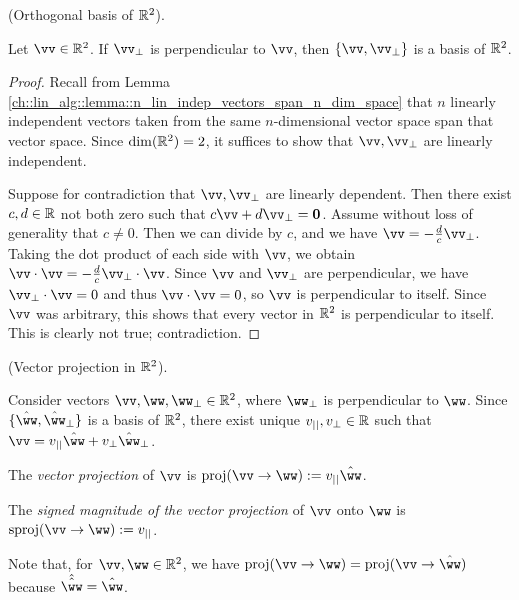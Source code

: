 \begin{lemma}
    (Orthogonal basis of $\mathbb{R}^2$).

    Let $\vv \in \R^2$. If $\vv_\perp$ is perpendicular to $\vv$, then $\{\vv, \vv_\perp\}$ is a basis of $\mathbb{R}^2$.
\end{lemma}

\begin{proof}
    Recall from Lemma \ref{ch::lin_alg::lemma::n_lin_indep_vectors_span_n_dim_space} that $n$ linearly independent vectors taken from the same $n$-dimensional vector space span that vector space. Since $\dim(\mathbb{R}^2) = 2$, it suffices to show that $\vv, \vv_\perp$ are linearly independent.

    Suppose for contradiction that $\vv, \vv_\perp$ are linearly dependent. Then there exist $c, d \in \mathbb{R}$ not both zero such that $c\vv + d\vv_\perp = \mathbf{0}$. Assume without loss of generality that $c \neq 0$. Then we can divide by $c$, and we have $\vv = -\frac{d}{c}\vv_\perp$. Taking the dot product of each side with $\vv$, we obtain $\vv \cdot \vv = -\frac{d}{c}\vv_\perp \cdot \vv$. Since $\vv$ and $\vv_\perp$ are perpendicular, we have $\vv_\perp \cdot \vv = 0$ and thus $\vv \cdot \vv = 0$, so $\vv$ is perpendicular to itself. Since $\vv$ was arbitrary, this shows that every vector in $\mathbb{R}^2$ is perpendicular to itself. This is clearly not true; contradiction.
\end{proof}

\begin{defn}
\label{ch::lin_alg::defn::vector_proj}
    (Vector projection in $\mathbb{R}^2$).
    
    Consider vectors $\vv, \ww, \ww_\perp \in \R^2$, where $\ww_\perp$ is perpendicular to $\ww$. Since $\{\hww, \hww_\perp\}$ is a basis of $\mathbb{R}^2$, there exist unique $v_{||}, v_\perp \in \mathbb{R}$ such that $\vv = v_{||} \hww + v_\perp \hww_\perp$.
    
    The \textit{vector projection} of $\vv$ is $\proj(\vv \rightarrow \ww) := v_{||} \hww$.

    The \textit{signed magnitude of the vector projection} of $\vv$ onto $\ww$ is $\sproj(\vv \rightarrow \ww) := v_{||}$. 
\end{defn}

\begin{remark}
    Note that, for $\vv, \ww \in \R^2$, we have $\proj(\vv \rightarrow \ww) = \proj(\vv \rightarrow \hww)$ because $\hat{\hww} = \hat{\ww}$.
\end{remark}

